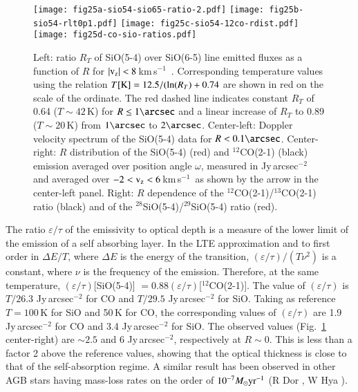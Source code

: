 \documentclass{aa}
\newcommand{\kms}{\,km\,s$^{-1}$~}
\begin{document}
\begin{figure*}
  \centering
 \texttt{[image: fig25a-sio54-sio65-ratio-2.pdf]}
 \texttt{[image: fig25b-sio54-rlt0p1.pdf]}
 \texttt{[image: fig25c-sio54-12co-rdist.pdf]}
 \texttt{[image: fig25d-co-sio-ratios.pdf]}  
 \caption{Left: ratio $R_T$ of SiO(5-4) over SiO(6-5) line emitted
   fluxes as a function of $R$ for $|{\rm v_z}|<8$\kms. Corresponding
   temperature values using the relation $T{\rm [K]} =
   12.5/(\ln(R_T)+0.74$ are shown in red on the scale of the ordinate.
   The red dashed line indicates constant $R_T$ of 0.64 ($T \sim 42$\,K)
   for $R \leq 1\arcsec$
   and a linear increase of $R_T$ to 0.89  ($T \sim 20$\,K) from $1\arcsec$
   to $2\arcsec$.
   Center-left: Doppler velocity spectrum of the SiO(5-4) data for
   $R<0.1\arcsec$. Center-right: $R$ distribution of the SiO(5-4)
   (red) and $^{12}$CO(2-1) (black) emission averaged over position
   angle $\omega$, measured in Jy\,arcsec$^{-2}$ and averaged over
   $-2<{\rm v_z}<6$\kms as shown by the arrow in the center-left
   panel. Right: $R$ dependence of the
   $^{12}$CO(2-1)/$^{13}$CO(2-1) ratio (black) and of the
   $^{28}$SiO(5-4)/$^{29}$SiO(5-4) ratio (red).}
 \label{SiOCOisofig}
\end{figure*}

The ratio $\varepsilon/\tau$ of the emissivity to optical depth is a
measure of the lower limit of the emission of a self absorbing
layer. In the LTE approximation and to first order in $\Delta E/T$,
where $\Delta E$ is the energy of the transition,
$(\varepsilon/\tau)/(T\nu^2)$ is a constant, where $\nu$ is the
frequency of the emission. Therefore, at the same temperature,
$(\varepsilon/\tau)$[SiO(5-4)]
$=0.88(\varepsilon/\tau)$[$^{12}$CO(2-1)]. The value of
$(\varepsilon/\tau)$ is $T/26.3$ Jy\,arcsec$^{-2}$ for CO and $T/29.5$
Jy\,arcsec$^{-2}$ for SiO. Taking as reference $T=100$\,K for SiO and
50\,K for CO, the corresponding values of $(\varepsilon/\tau)$ are 1.9
Jy\,arcsec$^{-2}$ for CO and 3.4 Jy\,arcsec$^{-2}$ for SiO. The
observed values (Fig.~\ref{SiOCOisofig} center-right) are $\sim2.5$
and 6 Jy\,arcsec$^{-2}$, respectively at $R\sim 0$. This is less than
a factor 2 above the reference values, showing that the optical
thickness is close to that of the self-absorption regime. A similar
result has been observed in other AGB stars having mass-loss rates on
the order of $10^{-7}M_\odot{\rm yr}^{-1}$  (R Dor
\citep{nhungetal2021},  W Hya \citep{takigawaetal2017}).
\end{document}
